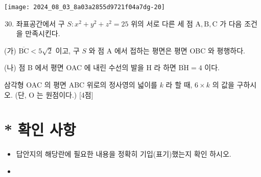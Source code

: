 \documentclass[10pt]{article}
\begin{document}
\begin{center}
\texttt{[image: 2024\_08\_03\_8a03a2855d9721f04a7dg-20]}
\end{center}

\begin{enumerate}
  \setcounter{enumi}{29}
  \item 좌표공간에서 구 \(S: x^{2}+y^{2}+z^{2}=25\) 위의 서로 다른 세 점 \(\mathrm{A}, \mathrm{B}, \mathrm{C}\) 가 다음 조건을 만족시킨다.
\end{enumerate}

(가) \(\overline{\mathrm{BC}}<5 \sqrt{2}\) 이고, 구 \(S\) 와 점 A 에서 접하는 평면은 평면 OBC 와 평행하다.

(나) 점 B 에서 평면 OAC 에 내린 수선의 발을 H 라 하면 \(\overline{\mathrm{BH}}=4\) 이다.

삼각형 OAC 의 평면 ABC 위로의 정사영의 넓이를 \(k\) 라 할 때, \(6 \times k\) 의 값을 구하시오. (단, O 는 원점이다.) [4점]

\section*{* 확인 사항}
\begin{itemize}
  \item 답안지의 해당란에 필요한 내용을 정확히 기입(표기)했는지 확인 하시오.
\end{itemize}

\begin{itemize}
  \item 
\end{itemize}
\end{document}

